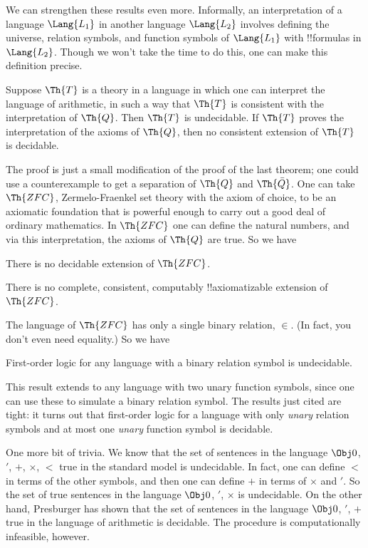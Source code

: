 \documentclass[../../../include/open-logic-section]{subfiles}
\begin{document}


We can strengthen these results even more. Informally, an
interpretation of a language $\Lang{L_1}$ in another language
$\Lang{L_2}$ involves defining the universe, relation symbols, and
function symbols of $\Lang{L_1}$ with !!{formula}s in
$\Lang{L_2}$. Though we won't take the time to do this, one can make
this definition precise.

\begin{thm}
  Suppose $\Th{T}$ is a theory in a language in which one can
  interpret the language of arithmetic, in such a way that $\Th{T}$ is
  consistent with the interpretation of $\Th{Q}$. Then $\Th{T}$ is
  undecidable. If $\Th{T}$ proves the interpretation of the axioms of
  $\Th{Q}$, then no consistent extension of $\Th{T}$ is decidable.
\end{thm}

The proof is just a small modification of the proof of the last
theorem; one could use a counterexample to get a separation of $\Th{Q}$ and
$\Th{\bar Q}$. One can take $\Th{ZFC}$, Zermelo-Fraenkel set theory with the
axiom of choice, to be an axiomatic foundation that is powerful enough
to carry out a good deal of ordinary mathematics. In $\Th{ZFC}$ one
can define the natural numbers, and via this interpretation, the
axioms of $\Th{Q}$ are true. So we have

\begin{cor}
There is no decidable extension of $\Th{ZFC}$.
\end{cor}

\begin{cor}
There is no complete, consistent, computably !!{axiomatizable} extension of
$\Th{ZFC}$. 
\end{cor}

The language of $\Th{ZFC}$ has only a single binary relation,
$\in$. (In fact, you don't even need equality.) So we have

\begin{cor}
First-order logic for any language with a binary relation symbol is
undecidable.
\end{cor}

This result extends to any language with two unary function symbols,
since one can use these to simulate a binary relation symbol. The
results just cited are tight: it turns out that first-order logic for
a language with only \emph{unary} relation symbols and at most one
\emph{unary} function symbol is decidable.

One more bit of trivia. We know that the set of sentences in the
language $\Obj 0$, $'$, $+$, $\times$, $<$ true in the standard model
is undecidable. In fact, one can define $<$ in terms of the other
symbols, and then one can define $+$ in terms of $\times$ and $'$. So
the set of true sentences in the language $\Obj 0$, $'$, $\times$ is
undecidable. On the other hand, Presburger has shown that the set of
sentences in the language $\Obj 0$, $'$, $+$ true in the language of
arithmetic is decidable. The procedure is computationally infeasible,
however.
\end{document}
